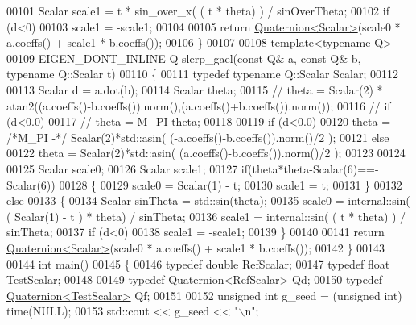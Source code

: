 \begin{DoxyCode}
00101   Scalar scale1 = t * sin\_over\_x( ( t * theta) ) / sinOverTheta;
00102   \textcolor{keywordflow}{if} (d<0)
00103     scale1 = -scale1;
00104 
00105   \textcolor{keywordflow}{return} \hyperlink{group___geometry___module_class_eigen_1_1_quaternion}{Quaternion<Scalar>}(scale0 * a.coeffs() + scale1 * b.coeffs());
00106 \}
00107 
00108 \textcolor{keyword}{template}<\textcolor{keyword}{typename} Q>
00109 EIGEN\_DONT\_INLINE Q slerp\_gael(\textcolor{keyword}{const} Q& a, \textcolor{keyword}{const} Q& b, \textcolor{keyword}{typename} Q::Scalar t)
00110 \{
00111   \textcolor{keyword}{typedef} \textcolor{keyword}{typename} Q::Scalar Scalar;
00112   
00113   Scalar d = a.dot(b);
00114   Scalar theta;
00115 \textcolor{comment}{//   theta = Scalar(2) * atan2((a.coeffs()-b.coeffs()).norm(),(a.coeffs()+b.coeffs()).norm());}
00116 \textcolor{comment}{//   if (d<0.0)}
00117 \textcolor{comment}{//     theta = M\_PI-theta;}
00118   
00119   \textcolor{keywordflow}{if} (d<0.0)
00120     theta = \textcolor{comment}{/*M\_PI -*/} Scalar(2)*std::asin( (-a.coeffs()-b.coeffs()).norm()/2 );
00121   \textcolor{keywordflow}{else}
00122     theta = Scalar(2)*std::asin( (a.coeffs()-b.coeffs()).norm()/2 );
00123   
00124   
00125   Scalar scale0;
00126   Scalar scale1;
00127   \textcolor{keywordflow}{if}(theta*theta-Scalar(6)==-Scalar(6))
00128   \{
00129     scale0 = Scalar(1) - t;
00130     scale1 = t;
00131   \}
00132   \textcolor{keywordflow}{else}
00133   \{
00134     Scalar sinTheta = std::sin(theta);
00135     scale0 = internal::sin( ( Scalar(1) - t ) * theta) / sinTheta;
00136     scale1 = internal::sin( ( t * theta) ) / sinTheta;
00137     \textcolor{keywordflow}{if} (d<0)
00138       scale1 = -scale1;
00139   \}
00140 
00141   \textcolor{keywordflow}{return} \hyperlink{group___geometry___module_class_eigen_1_1_quaternion}{Quaternion<Scalar>}(scale0 * a.coeffs() + scale1 * b.coeffs());
00142 \}
00143 
00144 \textcolor{keywordtype}{int} main()
00145 \{
00146   \textcolor{keyword}{typedef} \textcolor{keywordtype}{double} RefScalar;
00147   \textcolor{keyword}{typedef} \textcolor{keywordtype}{float} TestScalar;
00148   
00149   \textcolor{keyword}{typedef} \hyperlink{group___geometry___module_class_eigen_1_1_quaternion}{Quaternion<RefScalar>}  Qd;
00150   \textcolor{keyword}{typedef} \hyperlink{group___geometry___module_class_eigen_1_1_quaternion}{Quaternion<TestScalar>} Qf;
00151   
00152   \textcolor{keywordtype}{unsigned} \textcolor{keywordtype}{int} g\_seed = (\textcolor{keywordtype}{unsigned} int) time(NULL);
00153   std::cout << g\_seed << \textcolor{stringliteral}{"\(\backslash\)n"};

\end{DoxyCode}

